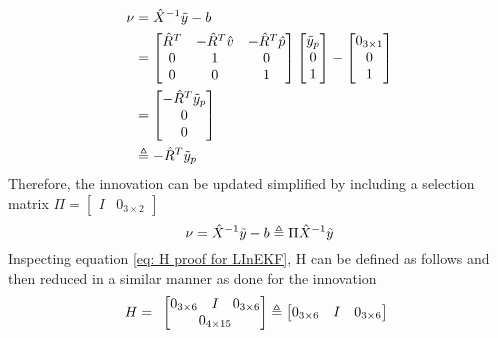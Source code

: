 \begin{equation}
    \begin{split}
        \nu &= \hat{X}^{-1} \Tilde{y} - b\\
        &= \begin{bmatrix}
            \hat{R}^T & -\hat{R}^T \hat{v} & -\hat{R}^T \hat{p} \\
            0 & 1 & 0\\
            0 & 0 & 1
        \end{bmatrix}
        \begin{bmatrix}
            \Tilde{y}_p \\
            0 \\
            1
        \end{bmatrix}
        - 
        \begin{bmatrix}
            0_{3 \times 1} \\
            0 \\
            1
        \end{bmatrix} \\
        &= 
        \begin{bmatrix}
            -\hat{R}^T \Tilde{y}_p \\
            0 \\
            0
        \end{bmatrix} \\
        &\triangleq -\hat{R}^T \Tilde{y}_p
    \end{split}
    \label{eq: innovation meas LInEKF}
\end{equation}
Therefore, the innovation can be updated simplified by including a selection matrix \cite{DBLP:journals/corr/BarrauB14} $\Pi = \begin{bmatrix}
    I & 0_{3 \times 2} \end{bmatrix}$
\begin{equation}
    \nu = \hat{X}^{-1} \Tilde{y} - b \triangleq \Pi \hat{X}^{-1} \Tilde{y}
    \label{eq: reduced measurement residual}
\end{equation} 
Inspecting equation \eqref{eq: H proof for LInEKF}, H can be defined as follows and then reduced in a similar manner as done for the innovation
\begin{equation}
    H = \begin{array}{c}
        \begin{bmatrix}
            0_{3 \times 6} & I & 0_{3 \times 6} \\
            \multicolumn{3}{c}{0_{4 \times 15}}
        \end{bmatrix} \triangleq \begin{bmatrix}
        0_{3 \times 6} & I & 0_{3 \times 6}
    \end{bmatrix}
    \end{array}
    \label{eq: H full for LInEKF}
\end{equation}
